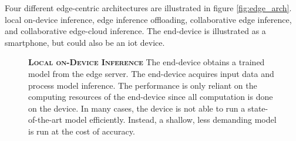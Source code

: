 Four different edge-centric architectures are illustrated in figure \ref{fig:edge_arch}. \protect{} local on-device inference, \protect{} edge inference offloading, \protect{} collaborative edge inference, and \protect{}  collaborative edge-cloud inference. The end-device is illustrated as a smartphone, but could also be an \gls{iot} device.
\begin{figure}
	\begin{minipage}{0.65\linewidth}
		\textbf{\protect{} \textsc{Local on-Device Inference}}
		\color{caption-color} \newline
		The end-device obtains a trained model from the edge server. The end-device acquires input data and process model inference. The performance is only reliant on the computing resources of the end-device since all computation is done on the device. In many cases, the device is not able to run a state-of-the-art model efficiently. Instead, a shallow, less demanding model is run at the cost of accuracy.
	\end{minipage}%
	\hfill
	\begin{minipage}{0.3\linewidth}
		\centering
		\captionsetup[subfigure]{justification=centering}
		\begin{figure}
			\centering
		\end{figure}
	\end{minipage}
	

\end{figure}
